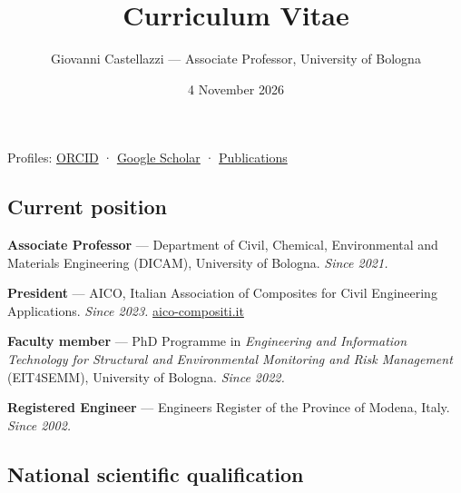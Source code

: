 \documentclass[
  10pt,
  a4paper,
  DIV=11,
  numbers=noendperiod]{scrartcl}
\title{Curriculum Vitae}
\subtitle{Giovanni Castellazzi --- Associate Professor, University of
Bologna}
\author{}
\date{4 November 2026}
\renewcommand*\contentsname{Table of contents}
\newcommand\contentsname{Table of contents}
\begin{document}
\maketitle

\renewcommand*\contentsname{Table of contents}
{
\setcounter{tocdepth}{2}
\tableofcontents
}

\begin{tcolorbox}[enhanced jigsaw, arc=.35mm, bottomrule=.15mm, breakable, colback=white, colframe=quarto-callout-note-color-frame, left=2mm, leftrule=.75mm, opacityback=0, rightrule=.15mm, toprule=.15mm]
\begin{minipage}[t]{5.5mm}
\textcolor{quarto-callout-note-color}{\faInfo}
\end{minipage}%
\begin{minipage}[t]{\textwidth - 5.5mm}

Profiles: \href{https://orcid.org/0000-0001-5870-5474}{ORCID} ·
\href{https://scholar.google.com/citations?user=pPopX2QAAAAJ&hl=it}{Google
Scholar} ·
\href{https://gcastellazzi.github.io/publications.html}{Publications}

\end{minipage}%
\end{tcolorbox}

\subsection{Current position}\label{current-position}

\textbf{Associate Professor} --- Department of Civil, Chemical,
Environmental and Materials Engineering (DICAM), University of Bologna.
\emph{Since 2021.}

\textbf{President} --- AICO, Italian Association of Composites for Civil
Engineering Applications. \emph{Since 2023.}
\href{https://www.aico-compositi.it}{aico-compositi.it}

\textbf{Faculty member} --- PhD Programme in \emph{Engineering and
Information Technology for Structural and Environmental Monitoring and
Risk Management} (EIT4SEMM), University of Bologna. \emph{Since 2022.}

\textbf{Registered Engineer} --- Engineers Register of the Province of
Modena, Italy. \emph{Since 2002.}

\subsection{National scientific
qualification}\label{national-scientific-qualification}
\end{document}
